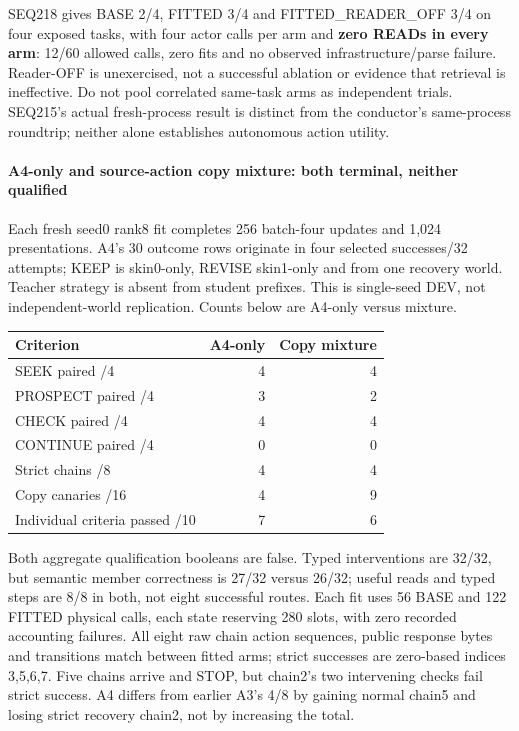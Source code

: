\documentclass[11pt]{article}
\begin{document}
SEQ218 gives BASE 2/4, FITTED 3/4 and FITTED\_READER\_OFF 3/4 on four exposed
tasks, with four actor calls per arm and \textbf{zero READs in every arm}: 12/60
allowed calls, zero fits and no observed infrastructure/parse failure.
Reader-OFF is unexercised, not a successful ablation or evidence that retrieval
is ineffective. Do not pool correlated same-task arms as independent trials.
SEQ215's actual fresh-process result is distinct from the conductor's
same-process roundtrip; neither alone establishes autonomous action utility.

\paragraph{A4-only and source-action copy mixture: both terminal, neither qualified}

Each fresh seed0 rank8 fit completes 256 batch-four updates and 1,024
presentations. A4's 30 outcome rows originate in four selected successes/32
attempts; KEEP is skin0-only, REVISE skin1-only and from one recovery world.
Teacher strategy is absent from student prefixes. This is single-seed DEV,
not independent-world replication. Counts below are A4-only versus mixture.

\begin{center}
\begin{tabular}{lrr}
\toprule
Criterion & A4-only & Copy mixture \\
\midrule
SEEK paired /4 & 4 & 4 \\
PROSPECT paired /4 & 3 & 2 \\
CHECK paired /4 & 4 & 4 \\
CONTINUE paired /4 & 0 & 0 \\
Strict chains /8 & 4 & 4 \\
Copy canaries /16 & 4 & 9 \\
Individual criteria passed /10 & 7 & 6 \\
\bottomrule
\end{tabular}
\end{center}

Both aggregate qualification booleans are false. Typed interventions are 32/32,
but semantic member correctness is 27/32 versus 26/32; useful reads and typed
steps are 8/8 in both, not eight successful routes. Each fit uses 56 BASE and
122 FITTED physical calls, each state reserving 280 slots, with zero recorded
accounting failures. All eight raw chain action sequences, public response bytes
and transitions match between fitted arms; strict successes are zero-based
indices 3,5,6,7. Five chains arrive and STOP, but chain2's two intervening checks
fail strict success. A4 differs from earlier A3's 4/8 by gaining normal chain5
and losing strict recovery chain2, not by increasing the total.
\end{document}
